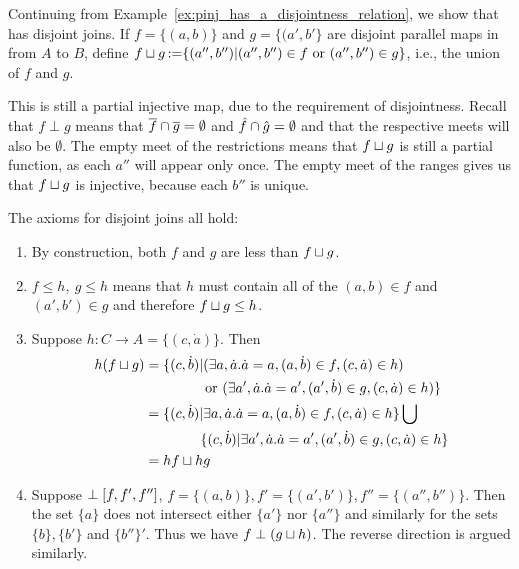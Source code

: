 \begin{example}\label{ex:pinj_has_a_disjoint_join}
  Continuing from Example~\ref{ex:pinj_has_a_disjointness_relation}, we show that \pinj has disjoint
  joins. If $f = \{(a,b)\}$ and $g=\{(a',b'\}$ are disjoint parallel maps in \pinj from $A$ to $B$,
  define $f\sqcup g \operatorname*{:\!=} \{(a'',b'') | (a'',b'') \in f\text{ or }(a'',b'') \in g\}$, i.e., the
  union of $f$ and $g$.

  This is still a partial injective map, due to the requirement of disjointness. Recall that $f\perp
  g$ means that $\overline{f}\cap \overline{g} = \emptyset$ and $\hat{f}\cap\hat{g} =
  \emptyset$ and that the respective meets will also be $\emptyset$. The empty meet of the
  restrictions means that $f\sqcup g$ is still a partial function,  as each $a''$ will appear only
  once. The empty meet of the ranges gives us that $f\sqcup g$ is injective, because each $b''$ is
  unique.

  The axioms for disjoint joins all hold:
  \begin{enumerate}
    \item[\axiom{DJ}{1}] By construction, both $f$ and $g$ are less than $f\sqcup g$.
    \item[\axiom{DJ}{2}] $f \le h,\ g \le h$ means that $h$ must contain all of the $(a,b)\in f$ and
      $(a',b') \in g$ and therefore $f\sqcup g \le h$.
    \item[\axiom{DJ}{3}] Suppose $h:C\to A = \{(c,\dot{a})\}$. Then
      \begin{align*}
        h(f \sqcup g) &= \{(c,\dot{b}) |(\exists a,\dot{a}.\dot{a} = a, (a,\dot{b}) \in f,
        (c,\dot{a}) \in h) \\
        & \qquad\qquad \text{ or }(\exists a',\dot{a}.\dot{a} = a', (a',\dot{b}) \in g, (c,\dot{a}) \in h)\}\\
        & = \{(c,\dot{b}) |\exists a, \dot{a}.\dot{a} = a, (a,\dot{b}) \in f, (c,\dot{a}) \in h\} \bigcup\\
        & \qquad\qquad\{(c,\dot{b}) | \exists a',\dot{a}.\dot{a} = a', (a',\dot{b}) \in g, (c,\dot{a}) \in h\}\\
        &= h f \sqcup h g
      \end{align*}
    \item[\axiom{DJ}{4}] Suppose $\perp [f, f', f'']$, $f=\{(a,b)\}, f'=\{(a',b')\},
      f''=\{(a'',b'')\}$. Then the set $\{a\}$ does not intersect either $\{a'\}$ nor $\{a''\}$ and
      similarly for the sets $\{b\}, \{b'\}$ and $\{b''\}'$. Thus we have $f \perp (g\sqcup h)$. The
      reverse direction is argued similarly.
  \end{enumerate}
\end{example}


